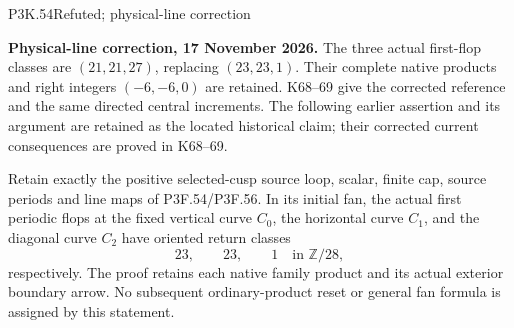 \begin{statement}{P3K.54}{Refuted; physical-line correction}\par\noindent\textbf{Physical-line correction, 17 November 2026.} The three actual first-flop classes are \((21,21,27)\), replacing \((23,23,1)\). Their complete native products and right integers \((-6,-6,0)\) are retained. K68--69 give the corrected reference and the same directed central increments. The following earlier assertion and its argument are retained as the located historical claim; their corrected current consequences are proved in K68--69.\medskip\par 
Retain exactly the positive selected-cusp source loop, scalar, finite cap,
source periods and line maps of P3F.54/P3F.56. In its initial fan,
the actual first periodic flops at the fixed vertical curve \(C_0\),
the horizontal curve \(C_1\), and the diagonal curve \(C_2\) have
oriented return classes
\[
 23,\qquad23,\qquad1\quad\text{in }\mathbb Z/28,
\]
respectively. The proof retains each native family product and its
actual exterior boundary arrow. No subsequent ordinary-product
reset or general fan formula is assigned by this statement.
\end{statement}
